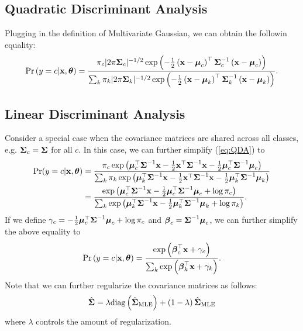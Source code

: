 \documentclass{article}
\begin{document}
\subsection{Quadratic Discriminant Analysis}
Plugging in the definition of Multivariate Gaussian, we can obtain the followin equality:
\begin{equation}
  \label{eq:QDA}
  \text{Pr}\pn{y = c | \xx, \thetab} = \f{ \pi_c |2\pi \Sigmab_c |^{-1/2} \exp\pn{-\f{1}{2}\pn{\xx - \mub_c}^\top \Sigmab_c^{-1} \pn{\xx - \mub_c} }}{ \sum_k \pi_k |2\pi \Sigmab_k |^{-1/2} \exp\pn{-\f{1}{2}\pn{\xx - \mub_k}^\top \Sigmab_k^{-1} \pn{\xx - \mub_k} }}.
\end{equation}

\subsection{Linear Discriminant Analysis}
Consider a special case when the covariance matrices are shared across all classes, e.g. $\hbox{\boldmath$\Sigma$}_c = \hbox{\boldmath$\Sigma$}$ for all $c$. In this case, we can further simplify (\ref{eq:QDA}) to
\begin{equation}
  \begin{split}
    \text{Pr}(y = c|{\mathbf{x}}, \hbox{\boldmath$\theta$}) &= \frac{\pi_c \exp\left( \hbox{\boldmath$\mu$}_c^\top \hbox{\boldmath$\Sigma$}^{-1}{\mathbf{x}} - \frac{1}{2} {\mathbf{x}}^\top \hbox{\boldmath$\Sigma$}^{-1} {\mathbf{x}} - \frac{1}{2}\hbox{\boldmath$\mu$}_c^\top \hbox{\boldmath$\Sigma$}^{-1} \hbox{\boldmath$\mu$}_c \right)}{\sum_k \pi_k \exp\left( \hbox{\boldmath$\mu$}_k^\top \hbox{\boldmath$\Sigma$}^{-1}{\mathbf{x}} - \frac{1}{2} {\mathbf{x}}^\top \hbox{\boldmath$\Sigma$}^{-1} {\mathbf{x}} - \frac{1}{2}\hbox{\boldmath$\mu$}_k^\top \hbox{\boldmath$\Sigma$}^{-1} \hbox{\boldmath$\mu$}_k \right)} \\
    &= \frac{\exp\left( \hbox{\boldmath$\mu$}_c^\top \hbox{\boldmath$\Sigma$}^{-1} {\mathbf{x}} - \frac{1}{2}\hbox{\boldmath$\mu$}_c^\top \hbox{\boldmath$\Sigma$}^{-1}\hbox{\boldmath$\mu$}_c + \log \pi_c  \right) }{ \sum_k \exp\left( \hbox{\boldmath$\mu$}_k^\top \hbox{\boldmath$\Sigma$}^{-1} {\mathbf{x}} - \frac{1}{2}\hbox{\boldmath$\mu$}_k^\top \hbox{\boldmath$\Sigma$}^{-1}\hbox{\boldmath$\mu$}_k + \log \pi_k  \right)}.
  \end{split}
\end{equation}
If we define $\gamma_c = -\frac{1}{2}\hbox{\boldmath$\mu$}_c^\top \hbox{\boldmath$\Sigma$}^{-1}\hbox{\boldmath$\mu$}_c + \log \pi_c$ and $\hbox{\boldmath$\beta$}_c = \hbox{\boldmath$\Sigma$}^{-1}\hbox{\boldmath$\mu$}_c$, we can further simplify the above equality to
\begin{equation}
  \label{eq:softmax}
  \text{Pr}\pn{y = c | \xx, \thetab} = \f{\exp\pn{ \betab_c^\top \xx + \gamma_c} }{\sum_k \exp\pn{ \betab_k^\top\xx + \gamma_k }}.
\end{equation}
Note that we can further regularize the covariance matrices as follows:
\begin{equation}
  \label{eq:regularized_LDA}
  \hat{\Sigmab} = \lambda \text{diag}\pn{\hat{\Sigmab}_\text{MLE} } + \pn{1 - \lambda}\hat{\Sigmab}_\text{MLE}
\end{equation}
where $\lambda$ controls the amount of regularization.
\end{document}
